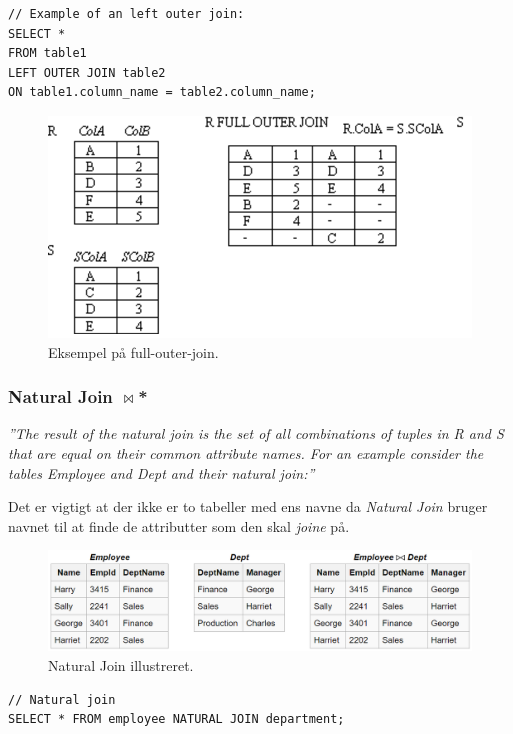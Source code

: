 \begin{lstlisting}[caption=SQL for Left Outer Join,label=code:crossjoin,morekeywords={SELECT, FROM, WHERE, CROSS, JOIN, LEFT, OUTER, ON}]
// Example of an left outer join:
SELECT *
FROM table1
LEFT OUTER JOIN table2
ON table1.column_name = table2.column_name;
\end{lstlisting}

\begin{figure}[H]
\centering
\includegraphics[width=0.6\linewidth]{figs/spm6/fullouterjoin}
\caption{Eksempel på full-outer-join.}
\label{fig:fullouterjoin}
\end{figure}

\subsubsection{Natural Join $\Join$*}

\textit{''The result of the natural join is the set of all combinations of tuples in R and S that are equal on their common attribute names. For an example consider the tables Employee and Dept and their natural join:''}

Det er vigtigt at der ikke er to tabeller med ens navne da \textit{Natural Join} bruger navnet til at finde de attributter som den skal \textit{joine} på.

\begin{figure}[H]
	\centering
	\includegraphics[width=\linewidth]{figs/spm6/naturaljoin}
	\caption{Natural Join illustreret.}
	\label{fig:naturaljoin}
\end{figure}

\begin{lstlisting}[caption=SQL for Cross Join,label=code:crossjoin,morekeywords={SELECT, FROM, WHERE, CROSS, JOIN, NATURAL}]
// Natural join
SELECT * FROM employee NATURAL JOIN department;
\end{lstlisting} 
